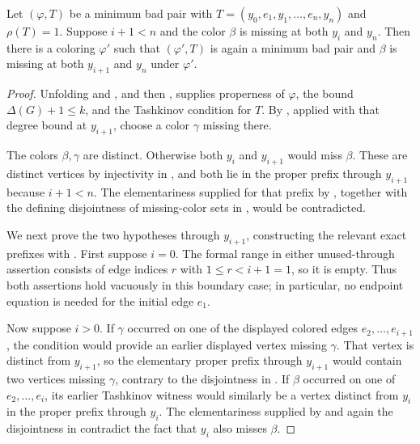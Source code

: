 \begin{helper}
Let \((\varphi,T)\) be a minimum bad pair with
\(T=(y_0,e_1,y_1,\ldots,e_n,y_n)\) and \(\rho(T)=1\).  Suppose
\(i+1<n\) and the color \(\beta\) is missing at both \(y_i\) and
\(y_n\).  Then there is a coloring \(\varphi'\) such that
\((\varphi',T)\) is again a minimum bad pair and \(\beta\) is missing
at both \(y_{i+1}\) and \(y_n\) under \(\varphi'\).
\end{helper}
\begin{proof}
Unfolding  and
, and then , supplies
properness of \(\varphi\), the bound
\(\Delta(G)+1\leq k\), and the Tashkinov condition for \(T\).
By , applied with that
degree bound at \(y_{i+1}\), choose a color \(\gamma\) missing there.

The colors \(\beta,\gamma\) are distinct.  Otherwise both \(y_i\) and
\(y_{i+1}\) would miss \(\beta\).  These are distinct vertices by
injectivity in , and both lie in the proper prefix
through \(y_{i+1}\) because \(i+1<n\).  The elementariness supplied for
that prefix by , together with
the defining disjointness of missing-color sets in
, would be contradicted.

We next prove the two  hypotheses
through \(y_{i+1}\), constructing the relevant exact prefixes with
.  First suppose \(i=0\).  The formal range
in either unused-through assertion consists of edge indices \(r\) with
\(1\leq r<i+1=1\), so it is empty.  Thus both assertions hold
vacuously in this boundary case; in particular, no endpoint equation is
needed for the initial edge \(e_1\).

Now suppose \(i>0\).  If \(\gamma\) occurred on one of the displayed
colored edges \(e_2,\ldots,e_{i+1}\), the
 condition would provide an earlier displayed
vertex missing \(\gamma\).  That vertex is distinct from \(y_{i+1}\),
so the elementary proper prefix through \(y_{i+1}\) would contain two
vertices missing \(\gamma\), contrary to the disjointness in
.  If \(\beta\) occurred on one of
\(e_2,\ldots,e_i\), its earlier Tashkinov witness would similarly be a
vertex distinct from \(y_i\) in the proper prefix through \(y_i\).
The elementariness supplied by
 and again the disjointness in
 contradict the fact that \(y_i\)
also misses \(\beta\).


\end{proof}
